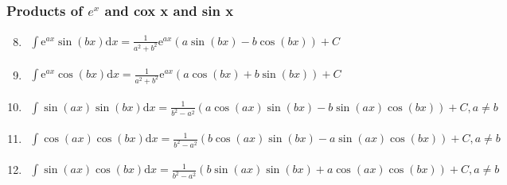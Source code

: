 \subsubsection{Products of $e^x$ and cox x and sin x}
 \begin{enumerate}
    \setcounter{enumi}{7}
    \item $\begin{aligned}
        \int \mathrm{e}^{a x} \sin (b x) \mathrm{d} x=\frac{1}{a^{2}+b^{2}} \mathrm{e}^{a x}(a \sin (b x)-b \cos (b x))+C\end{aligned}$ 
    \item $\begin{aligned}
        \int \mathrm{e}^{a x} \cos (b x) \mathrm{d} x=\frac{1}{a^{2}+b^{2}} \mathrm{e}^{a x}(a \cos (b x)+b \sin (b x))+C\end{aligned}$ 
    \item $\begin{aligned} 
        \int \sin (a x) \sin (b x) \mathrm{d} x=\frac{1}{b^{2}-a^{2}}(a \cos (a x) \sin (b x)-b \sin (a x) \cos (b x))+C, a \neq b\end{aligned}$ 
    \item $\begin{aligned} 
        \int \cos (a x) \cos (b x) \mathrm{d} x=\frac{1}{b^{2}-a^{2}}(b \cos (a x) \sin (b x)-a \sin (a x) \cos (b x))+C, a \neq b\end{aligned}$
    \item $\begin{aligned} 
        \int \sin (a x) \cos (b x) \mathrm{d} x=\frac{1}{b^{2}-a^{2}}(b \sin (a x) \sin (b x)+a \cos (a x) \cos (b x))+C, a \neq b\end{aligned}$
 \end{enumerate}

